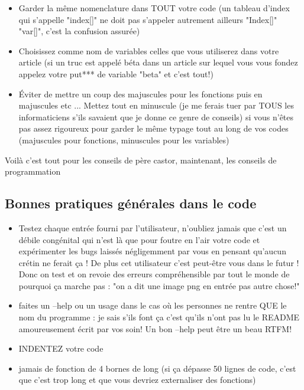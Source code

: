 \documentclass[a4paper,10pt]{book_ad}
\begin{document}
\begin{itemize}
\item Garder la même nomenclature dans TOUT votre code (un tableau d'index qui s'appelle "index[]" 
ne doit pas s'appeler autrement ailleurs "Index[]" "var[]", c'est la confusion assurée)
\item Choisissez comme nom de variables celles que vous utiliserez dans votre article 
(si un truc est appelé béta dans un article sur lequel vous vous fondez appelez votre put*** 
de variable "beta" et c'est tout!)
\item Éviter de mettre un coup des majuscules pour les fonctions puis en majuscules etc ... 
Mettez tout en minuscule (je me ferais tuer par TOUS les informaticiens s'ils savaient que je 
donne ce genre de conseils) si vous n'êtes pas assez rigoureux pour garder le même typage tout 
au long de vos codes (majuscules pour fonctions, minuscules pour les variables)
\end{itemize}


Voilà c'est tout pour les conseils de père castor, maintenant, les conseils de programmation\\

\subsection{Bonnes pratiques générales dans le code}

\begin{itemize}
\item Testez chaque entrée fourni par l'utilisateur, n'oubliez jamais que c'est un débile congénital
 qui n'est là que pour foutre en l'air votre code et expérimenter les bugs laissés négligemment par 
vous en pensant qu'aucun crétin ne ferait ça ! De plus cet utilisateur c'est peut-être vous dans 
le futur ! Donc on test et on revoie des erreurs compréhensible par tout le monde de pourquoi ça 
marche pas : "on a dit une image png en entrée pas autre chose!"
\item faites un --help ou un usage dans le cas où les personnes ne rentre QUE le nom du programme : 
je sais s'ils font ça c'est qu'ils n'ont pas lu le README amoureusement écrit par vos soin! Un bon
 --help peut être un beau RTFM!
\item INDENTEZ votre code
\item jamais de fonction de 4 bornes de long (si ça dépasse 50 lignes de code, c'est que c'est trop
 long et que vous devriez externaliser des fonctions)
\end{itemize}
\end{document}
